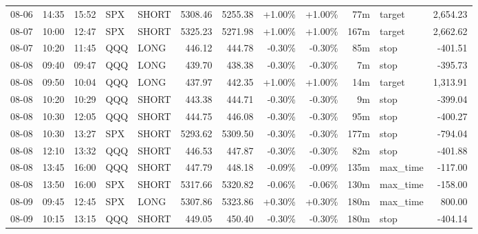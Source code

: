 \documentclass[11pt,a4paper,twoside]{article}
\begin{document}
\begin{center}
\begin{longtable}{>{\color{txtmain}}l l l l l r r r r r >{\color{txtmain}}l r}
08-06 & 14:35 & 15:52 & SPX & SHORT & 5308.46 & 5255.38 & \textcolor{wingreen}{+1.00\%} & \textcolor{wingreen}{+1.00\%} & 77m & target & \textcolor{wingreen}{2,654.23} \\
08-07 & 10:00 & 12:47 & SPX & SHORT & 5325.23 & 5271.98 & \textcolor{wingreen}{+1.00\%} & \textcolor{wingreen}{+1.00\%} & 167m & target & \textcolor{wingreen}{2,662.62} \\
08-07 & 10:20 & 11:45 & QQQ & LONG & 446.12 & 444.78 & \textcolor{lossred}{-0.30\%} & \textcolor{lossred}{-0.30\%} & 85m & stop & \textcolor{lossred}{-401.51} \\
08-08 & 09:40 & 09:47 & QQQ & LONG & 439.70 & 438.38 & \textcolor{lossred}{-0.30\%} & \textcolor{lossred}{-0.30\%} & 7m & stop & \textcolor{lossred}{-395.73} \\
08-08 & 09:50 & 10:04 & QQQ & LONG & 437.97 & 442.35 & \textcolor{wingreen}{+1.00\%} & \textcolor{wingreen}{+1.00\%} & 14m & target & \textcolor{wingreen}{1,313.91} \\
08-08 & 10:20 & 10:29 & QQQ & SHORT & 443.38 & 444.71 & \textcolor{lossred}{-0.30\%} & \textcolor{lossred}{-0.30\%} & 9m & stop & \textcolor{lossred}{-399.04} \\
08-08 & 10:30 & 12:05 & QQQ & SHORT & 444.75 & 446.08 & \textcolor{lossred}{-0.30\%} & \textcolor{lossred}{-0.30\%} & 95m & stop & \textcolor{lossred}{-400.27} \\
08-08 & 10:30 & 13:27 & SPX & SHORT & 5293.62 & 5309.50 & \textcolor{lossred}{-0.30\%} & \textcolor{lossred}{-0.30\%} & 177m & stop & \textcolor{lossred}{-794.04} \\
08-08 & 12:10 & 13:32 & QQQ & SHORT & 446.53 & 447.87 & \textcolor{lossred}{-0.30\%} & \textcolor{lossred}{-0.30\%} & 82m & stop & \textcolor{lossred}{-401.88} \\
08-08 & 13:45 & 16:00 & QQQ & SHORT & 447.79 & 448.18 & \textcolor{lossred}{-0.09\%} & \textcolor{lossred}{-0.09\%} & 135m & max\_time & \textcolor{lossred}{-117.00} \\
08-08 & 13:50 & 16:00 & SPX & SHORT & 5317.66 & 5320.82 & \textcolor{lossred}{-0.06\%} & \textcolor{lossred}{-0.06\%} & 130m & max\_time & \textcolor{lossred}{-158.00} \\
08-09 & 09:45 & 12:45 & SPX & LONG & 5307.86 & 5323.86 & \textcolor{wingreen}{+0.30\%} & \textcolor{wingreen}{+0.30\%} & 180m & max\_time & \textcolor{wingreen}{800.00} \\
08-09 & 10:15 & 13:15 & QQQ & SHORT & 449.05 & 450.40 & \textcolor{lossred}{-0.30\%} & \textcolor{lossred}{-0.30\%} & 180m & stop & \textcolor{lossred}{-404.14} \\

\end{longtable}
\end{center}
\end{document}
